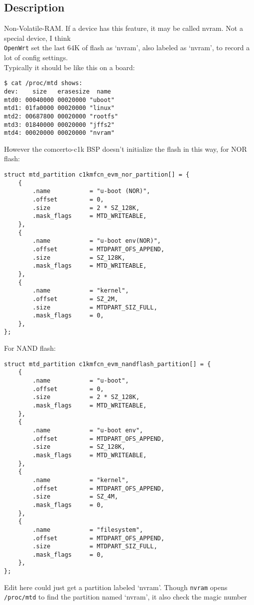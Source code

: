 \documentclass[a4paper]{report}
\begin{document}
\begin{enumerate}
\section{Description}
Non-Volatile-RAM. If a device has this feature, it may be called nvram. Not a 
special device, I think\\
{\tt OpenWrt} set the last 64K of flash as `nvram', also labeled as `nvram', to
record a lot of config settings.\\
Typically it should be like this on a board:
\begin{lstlisting}
$ cat /proc/mtd shows:
dev:    size   erasesize  name
mtd0: 00040000 00020000 "uboot"
mtd1: 01fa0000 00020000 "linux"
mtd2: 00687800 00020000 "rootfs"
mtd3: 01840000 00020000 "jffs2"
mtd4: 00020000 00020000 "nvram"
\end{lstlisting}
However the comcerto-c1k BSP doesn't initialize the flash in this way, for NOR 
flash:
\begin{lstlisting}
struct mtd_partition c1kmfcn_evm_nor_partition[] = {
    {
        .name           = "u-boot (NOR)",
        .offset         = 0,
        .size           = 2 * SZ_128K,
        .mask_flags     = MTD_WRITEABLE,
    },
    {
        .name           = "u-boot env(NOR)",
        .offset         = MTDPART_OFS_APPEND,
        .size           = SZ_128K,
        .mask_flags     = MTD_WRITEABLE,
    },
    {
        .name           = "kernel",
        .offset         = SZ_2M,
        .size           = MTDPART_SIZ_FULL,
        .mask_flags     = 0,
    },
};
\end{lstlisting}
For NAND flash:
\begin{lstlisting}
struct mtd_partition c1kmfcn_evm_nandflash_partition[] = {
    {
        .name           = "u-boot",
        .offset         = 0,
        .size           = 2 * SZ_128K,
        .mask_flags     = MTD_WRITEABLE,
    },
    {
        .name           = "u-boot env",
        .offset         = MTDPART_OFS_APPEND,
        .size           = SZ_128K,
        .mask_flags     = MTD_WRITEABLE,
    },
    {
        .name           = "kernel",
        .offset         = MTDPART_OFS_APPEND,
        .size           = SZ_4M,
        .mask_flags     = 0,
    },
    {
        .name           = "filesystem",
        .offset         = MTDPART_OFS_APPEND,
        .size           = MTDPART_SIZ_FULL,
        .mask_flags     = 0,
    },
};
\end{lstlisting}
Edit here could just get a partition labeled `nvram'. Though {\tt nvram} opens
{\tt /proc/mtd} to find the partition named `nvram', it also check the magic number

\end{enumerate}
\end{document}
